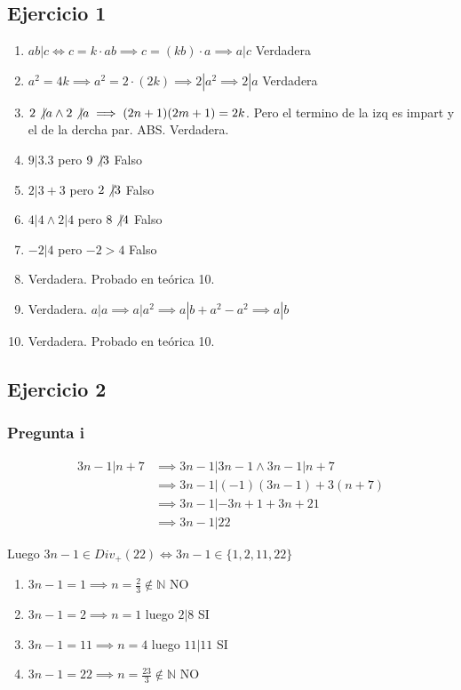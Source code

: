 \subsection{Ejercicio 1}
\begin{enumerate}
    \item $ ab | c \iff  c= k \cdot ab \implies c = (kb) \cdot a \implies a | c $ Verdadera
    \item $ a^2 = 4k \implies a^2 = 2 \cdot (2k) \implies 2 | a^2 \implies 2 |a $ Verdadera
    \item $ 2 \not \vert a \wedge 2 \not \vert a \implies (2n+1)(2m+1)=2k$. Pero el termino de la izq es impart y el de la dercha par. ABS. Verdadera.
    \item $ 9|3.3 $ pero $ 9 \not \vert 3 $ Falso
    \item $ 2|3+3 $ pero $ 2 \not \vert 3 $ Falso
    \item $ 4|4 \wedge 2|4 $ pero $ 8 \not \vert 4 $ Falso
    \item $ -2|4 $ pero $ -2 > 4 $ Falso
    \item Verdadera. Probado en teórica 10.
    \item Verdadera. $ a|a \implies a |a^2 \implies a|b+a^2-a^2 \implies a|b $
    \item Verdadera. Probado en teórica 10.
\end{enumerate}

\subsection{Ejercicio 2}
\subsubsection{Pregunta i}
\begin{align*}
    3n-1 | n+7 &\implies 3n-1 | 3n-1 \wedge 3n-1 | n+7  \\
    &\implies 3n-1 | (-1)(3n-1) + 3(n+7) \\
    &\implies 3n-1 | -3n+1+3n+21 \\
    &\implies 3n-1 | 22
\end{align*}

Luego $ 3n-1 \in Div_+(22) \iff 3n-1 \in \{ 1,2,11,22 \}$

\begin{enumerate}[label=(\alph*)]
    \item $ 3n-1 = 1 \implies n = \frac{2}{3} \not \in \mathbb{N}$ NO
    \item $ 3n-1 = 2 \implies n = 1 $ luego $ 2|8 $ SI 
    \item $ 3n-1 = 11 \implies n = 4 $ luego $ 11|11 $ SI 
    \item $ 3n-1 = 22 \implies n = \frac{23}{3} \not \in \mathbb{N} $ NO
\end{enumerate}

